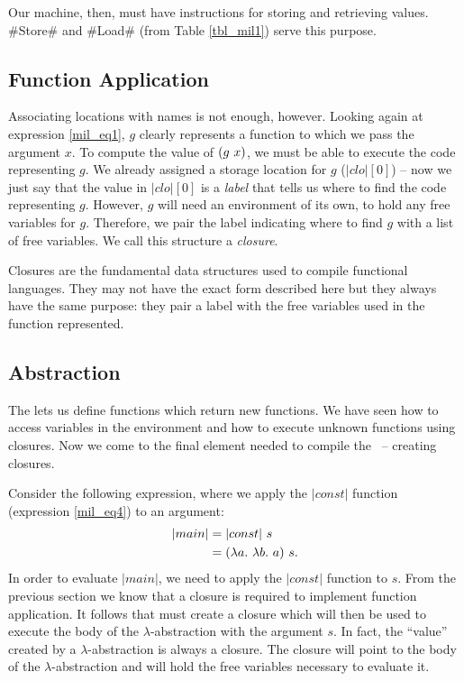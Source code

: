 \documentclass[12pt]{report}
\begin{document}
Our machine, then, must have instructions for storing and retrieving
values. #Store# and #Load# (from Table \ref{tbl_mil1}) serve this
purpose. 

\subsection{Function Application}
\label{mil_subsec2}

Associating locations with names is not enough, however. Looking again
at expression \ref{mil_eq1}, $g$ clearly represents a function to
which we pass the argument $x$. To compute the value of
$(g\ x)$, we must be able to execute the code representing
$g$. We already assigned a storage location for $g$ ($|clo|[0]$) -- now
we just say that the value in $|clo|[0]$ is a \emph{label} that tells
us where to find the code representing $g$. However, $g$ will need
an environment of its own, to hold any free variables for $g$. Therefore,
we pair the label indicating where to find $g$ with a list of free
variables. We call this structure a \emph{closure}.

Closures are the fundamental data structures used to compile
functional languages. They may not have the exact form described here
but they always have the same purpose: they pair a label with the free
variables used in the function represented. 

\subsection{Abstraction}
\label{mil_subsec3}
The \lamA lets us define functions which return new functions. We have
seen how to access variables in the environment and how to execute
unknown functions using closures. Now we come to the final element
needed to compile the \lamA\ -- creating closures.

Consider the following expression, where we apply the $|const|$ function (expression 
\ref{mil_eq4}) to an argument:
\begin{equation}
  \begin{split}
    |main| &= |const|\ s \\
         &= (\lambda a.\ \lambda b.\ a)\ s.
  \end{split}
\end{equation}
In order to evaluate $|main|$, we need to apply the $|const|$ function
to $s$. From the previous section we know that a closure is required to
implement function application. It follows that
 must create a closure which will
then be used to execute the body of the $\lambda$-abstraction with the
argument $s$. In fact, the ``value'' created by a
$\lambda$-abstraction is always a closure. The closure will point to
the body of the $\lambda$-abstraction and will hold the free variables
necessary to evaluate it.
\end{document}
